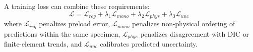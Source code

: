 A training loss can combine these requirements:
\begin{equation}
\mathcal{L}=\mathcal{L}_{reg}+\lambda_1\mathcal{L}_{mono}+\lambda_2\mathcal{L}_{phys}+\lambda_3\mathcal{L}_{unc}
\end{equation}
where $\mathcal{L}_{reg}$ penalizes preload error, $\mathcal{L}_{mono}$ penalizes non-physical ordering of predictions within the same specimen, $\mathcal{L}_{phys}$ penalizes disagreement with DIC or finite-element trends, and $\mathcal{L}_{unc}$ calibrates predicted uncertainty.

